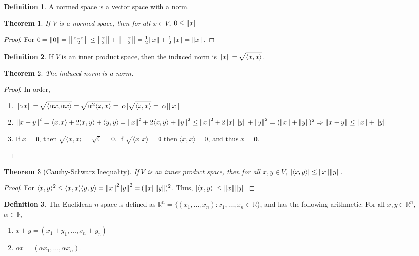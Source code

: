 \documentclass[oneside]{book}
\newtheorem{theorem}{Theorem}[section]
\theoremstyle{definition}
\newtheorem{definition}{Definition}[section]
\newcommand*\B[1]{\mathbf{#1}}
\begin{document}
\begin{definition}
A normed space is a vector space with a norm.
\end{definition}

\begin{theorem}
If $V$ is a normed space, then for all $x\in V$, $0\leq \norm{x}$
\end{theorem}
\begin{proof}
For $0=\norm{0} = \norm{\frac{x-x}{2}} \leq \norm{\frac{x}{2}}+\norm{-\frac{x}{2}} = \frac{1}{2}\norm{x} + \frac{1}{2}\norm{x} = \norm{x}$.
\end{proof}

\begin{definition}
If $V$ is an inner product space, then the induced norm is $\norm{x}=\sqrt{\langle x,x \rangle}$.
\end{definition}

\begin{theorem}
The induced norm is a norm.
\end{theorem}
\begin{proof}
In order,
\begin{enumerate}
\item $\norm{\alpha x} = \sqrt{\langle \alpha x, \alpha x \rangle} = \sqrt{\alpha^2 \langle x,x\rangle} = |\alpha| \sqrt{\langle x,x \rangle} = |\alpha| \norm{x}$
\item $\norm{x+y}^2= \langle x,x \rangle + 2\langle x,y \rangle + \langle y,y \rangle = \norm{x}^2 + 2\langle x,y \rangle + \norm{y}^2 \leq \norm{x}^2 +2\norm{x}\norm{y} + \norm{y}^2 = (\norm{x}+\norm{y})^2\Rightarrow \norm{x+y}\leq \norm{x}+\norm{y}$
\item If $x= \B{0}$, then $\sqrt{\langle x,x \rangle} = \sqrt{0} = 0$. If $\sqrt{\langle x,x \rangle} = 0$ then $\langle x,x \rangle = 0$, and thus $x = \B{0}$.
\end{enumerate}
\end{proof}

\begin{theorem}[Cauchy-Schwarz Inequality]
If $V$ is an inner product space, then for all $x,y \in V$, $|\langle x,y\rangle| \leq \norm{x} \norm{y}$.
\end{theorem}
\begin{proof}
For $\langle x,y \rangle^2 \leq \langle x,x \rangle \langle y,y \rangle = \norm{x}^2 \norm{y}^2 = (\norm{x}\norm{y})^2$. Thus, $|\langle x,y \rangle| \leq \norm{x}\norm{y}$
\end{proof}

\begin{definition}
The Euclidean $n$-space is defined as $\mathbb{R}^n=\{(x_1,\hdots, x_n):x_1,\hdots, x_n \in \mathbb{R}\}$, and has the following arithmetic: For all $x,y\in \mathbb{R}^n$, $\alpha \in \mathbb{R}$,
\begin{enumerate}
\item $x+y = (x_1+y_1,\hdots, x_n+y_n)$
\item $\alpha x = (\alpha x_1,\hdots, \alpha x_n)$.
\end{enumerate}
\end{definition}
\end{document}
